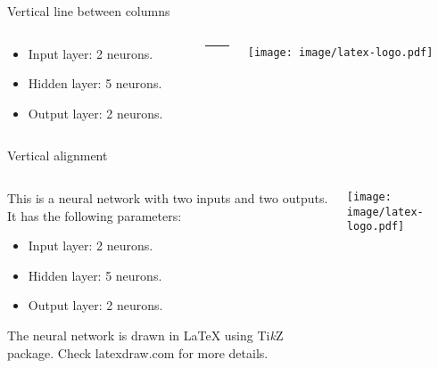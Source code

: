 \documentclass{beamer}
\begin{document}
\begin{frame}{Vertical line between columns}
  \begin{columns}
    \begin{column}{0.49\textwidth}
      \begin{itemize}
      \item Input layer: 2 neurons.
      \item Hidden layer: 5 neurons.
      \item Output layer: 2 neurons.
      \end{itemize}
    \end{column}

    \begin{column}{.02\textwidth}
      \rule{.1mm}{0.7\textheight}
    \end{column}

    \begin{column}{0.49\textwidth}
      \texttt{[image: image/latex-logo.pdf]}
    \end{column}
  \end{columns}
\end{frame}

\begin{frame}{Vertical alignment}
  \begin{columns}[T]  %
    \begin{column}{0.5\textwidth}
      This is a neural network with two inputs and two outputs. It has the following parameters:
      \begin{itemize}
      \item Input layer: 2 neurons.
      \item Hidden layer: 5 neurons.
      \item Output layer: 2 neurons.
      \end{itemize}
      The neural network is drawn in \LaTeX{} using Ti\textit{k}Z package. Check latexdraw.com for more details.
    \end{column}

    \begin{column}{0.5\textwidth}
      \texttt{[image: image/latex-logo.pdf]}
    \end{column}
  \end{columns}
\end{frame}

\end{document}
